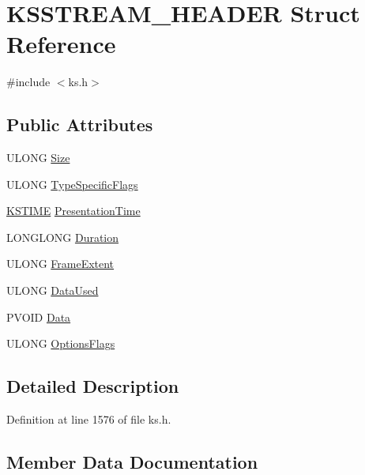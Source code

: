 \hypertarget{struct_k_s_s_t_r_e_a_m___h_e_a_d_e_r}{}\section{K\+S\+S\+T\+R\+E\+A\+M\+\_\+\+H\+E\+A\+D\+ER Struct Reference}
\label{struct_k_s_s_t_r_e_a_m___h_e_a_d_e_r}


{\ttfamily \#include $<$ks.\+h$>$}

\subsection*{Public Attributes}
\begin{DoxyCompactItemize}
\item 
U\+L\+O\+NG \hyperlink{struct_k_s_s_t_r_e_a_m___h_e_a_d_e_r_a2763cce2aed94a0c37e6630595e3c86d}{Size}
\item 
U\+L\+O\+NG \hyperlink{struct_k_s_s_t_r_e_a_m___h_e_a_d_e_r_aeca53d4cbd064803b36196b9f8f632da}{Type\+Specific\+Flags}
\item 
\hyperlink{struct_k_s_t_i_m_e}{K\+S\+T\+I\+ME} \hyperlink{struct_k_s_s_t_r_e_a_m___h_e_a_d_e_r_a5900b2557203944a2ba94ac03eb6e1f0}{Presentation\+Time}
\item 
L\+O\+N\+G\+L\+O\+NG \hyperlink{struct_k_s_s_t_r_e_a_m___h_e_a_d_e_r_a85200c653a11bbc54bb73852980b6f5a}{Duration}
\item 
U\+L\+O\+NG \hyperlink{struct_k_s_s_t_r_e_a_m___h_e_a_d_e_r_a08a3f73cbe6d08bf63ecf08d75ac3a2d}{Frame\+Extent}
\item 
U\+L\+O\+NG \hyperlink{struct_k_s_s_t_r_e_a_m___h_e_a_d_e_r_a848c0e966ba8bd1c3545121be62ca3a0}{Data\+Used}
\item 
P\+V\+O\+ID \hyperlink{struct_k_s_s_t_r_e_a_m___h_e_a_d_e_r_a6f6127c73baaa7e612ffb3337f9024c8}{Data}
\item 
U\+L\+O\+NG \hyperlink{struct_k_s_s_t_r_e_a_m___h_e_a_d_e_r_aa3c01e08df2301bcc31960826d9bf80f}{Options\+Flags}
\end{DoxyCompactItemize}


\subsection{Detailed Description}


Definition at line 1576 of file ks.\+h.



\subsection{Member Data Documentation}
